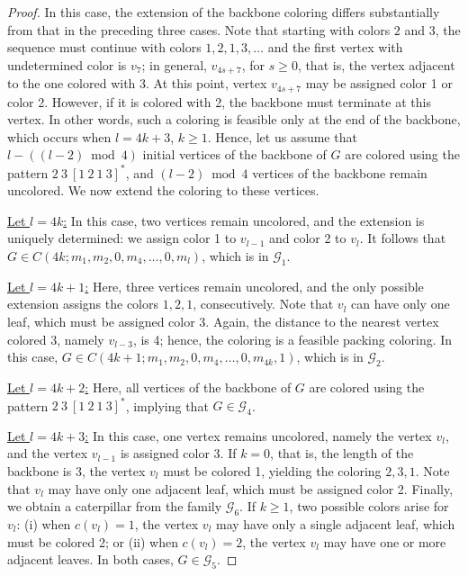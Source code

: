 \documentclass{article}
\begin{document}
\begin{proof}
In this case, the extension of the backbone coloring differs substantially from that in the preceding three cases. Note that starting with colors $2$ and $3$, the sequence must continue with colors $1, 2, 1, 3, \ldots$ and the first vertex with undetermined color is $v_7$; in general, $v_{4s+7}$, for $s\geq 0$, that is, the vertex adjacent to the one colored with $3$. At this point, vertex $v_{4s+7}$ may be assigned color 1 or color 2. However, if it is colored with 2, the backbone must terminate at this vertex. In other words, such a coloring is feasible only at the end of the backbone, which occurs when $l=4k+3$, $k\geq 1$. Hence, let us assume that $l - ((l-2) \bmod 4)$ initial vertices of the backbone of $G$ are colored using the pattern $2\ 3\ [1\ 2\ 1\ 3]^*$, and $(l-2)\bmod 4$ vertices of the backbone remain uncolored. We now extend the coloring to these vertices.

\underline{Let $l=4k$:} 
In this case, two vertices remain uncolored, and the extension is uniquely determined: we assign color 1 to $v_{l-1}$ and color 2 to $v_l$. It follows that $G \in C(4k; m_1, m_2,0, m_4,\ldots, 0, m_l)$, which is in $\mathcal{G}_1$.

\underline{Let $l=4k+1$:} 
Here, three vertices remain uncolored, and the only possible extension assigns the colors $1,2,1$, consecutively. Note that $v_l$ can have only one leaf, which must be assigned color 3. Again, the distance to the nearest vertex colored 3, namely $v_{l-3}$, is 4; hence, the coloring is a feasible packing coloring.
In this case, $G\in C(4k+1; m_1,m_2,0,m_4,\ldots,0,m_{4k},1)$, which is in $\mathcal{G}_2$.

\underline{Let $l=4k+2$:} Here, all vertices of the backbone of $G$ are colored using the pattern $2\ 3\ [1\ 2\ 1\ 3]^*$, implying that $G\in \mathcal{G}_4$. 

\underline{Let $l=4k+3$:} In this case, one vertex remains uncolored, namely the vertex $v_l$, and the vertex $v_{l-1}$ is assigned color 3. If $k=0$, that is, the length of the backbone is 3, the vertex $v_l$ must be colored 1, yielding the coloring $2, 3, 1$. Note that $v_l$ may have only one adjacent leaf, which must be assigned color 2. Finally, we obtain a caterpillar from the family $\mathcal{G}_6$. If $k\geq 1$, two possible colors  arise for $v_l$: (i) when $c(v_l)=1$, the vertex $v_l$ may have only a single adjacent leaf, which must be colored 2; or (ii) when $c(v_l)=2$, the vertex $v_l$ may have one or more adjacent leaves. In both cases, $G \in \mathcal{G}_5$. 


\end{proof}
\end{document}
